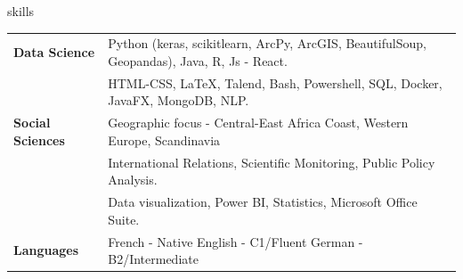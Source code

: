 \documentclass[a4paper]{resume} %
\begin{document}
\begin{rSection}{skills}

\begin{tabular}{ @{} >{\bfseries}l @{\hspace{4ex}} l }  
Data Science & Python (keras,
scikitlearn, ArcPy, ArcGIS, BeautifulSoup, Geopandas), Java, R, Js - React.\\& HTML-CSS, LaTeX, Talend, Bash, Powershell, SQL, Docker, JavaFX, MongoDB, NLP.\\
Social Sciences & Geographic focus - Central-East Africa Coast, Western Europe, Scandinavia
\\& International Relations, Scientific Monitoring, Public Policy Analysis.\\& Data visualization, Power BI, Statistics, Microsoft
Office Suite.
\\
Languages & French - Native \textbar{} English - C1/Fluent \textbar{} German - B2/Intermediate
\end{tabular}   

\end{rSection}


\end{document}
